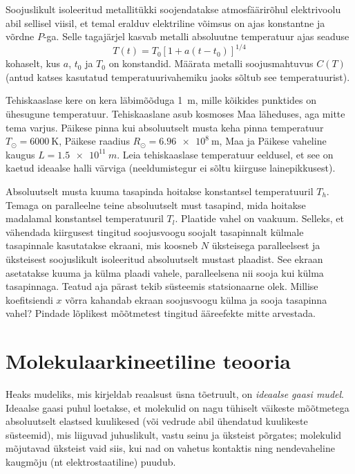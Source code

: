\documentclass[a4paper,11pt,twocolumn]{article}
\begin{document}
\begin{question}[IPhO 1996, T1]
	Soojuslikult isoleeritud metallitükki soojendatakse atmosfäärirõhul elektrivoolu abil sellisel viisil, et temal eralduv elektriline võimsus on ajas konstantne ja võrdne \( P \)-ga. Selle tagajärjel kasvab metalli absoluutne temperatuur ajas seaduse
	\[ T(t) = T_0[1 + a(t − t_0)]^{1/4} \]
	kohaselt, kus \( a \), \( t_0 \) ja \( T_0 \) on konstandid. Määrata metalli soojusmahtuvus \( C(T) \) (antud katses kasutatud temperatuurivahemiku jaoks sõltub see temperatuurist).
\end{question}
\begin{question}
	Tehiskaaslase kere on kera läbimõõduga \SI{1}{\meter}, mille kõikides punktides on ühesugune temperatuur. Tehiskaaslane asub kosmoses Maa läheduses, aga mitte tema varjus. Päikese pinna kui absoluutselt musta keha pinna temperatuur \( T_\odot = \SI{6000}{\kelvin} \), Päikese raadius \( R_\odot = \SI{6,96e8}{\meter} \), Maa ja Päikese vaheline kaugus \( L = \SI{1,5e11}{m} \). Leia tehiskaaslase temperatuur eeldusel, et see on kaetud ideaalse halli värviga (neeldumistegur ei sõltu kiirguse lainepikkusest).
\end{question}
\begin{question}[IPhO 1996, T1]
	Absoluutselt musta kuuma tasapinda hoitakse konstantsel temperatuuril \( T_h \). Temaga on paralleelne teine absoluutselt must tasapind, mida hoitakse madalamal konstantsel temperatuuril \( T_l \). Plaatide vahel on vaakuum. Selleks, et vähendada kiirgusest tingitud soojusvoogu soojalt tasapinnalt külmale tasapinnale kasutatakse ekraani, mis koosneb \( N \) üksteisega paralleelsest ja üksteisest soojuslikult isoleeritud absoluutselt mustast plaadist. See ekraan asetatakse kuuma ja külma plaadi vahele, paralleelsena nii sooja kui külma tasapinnaga. Teatud aja pärast tekib süsteemis statsionaarne olek. Millise koefitsiendi \( x \) võrra kahandab ekraan soojusvoogu külma ja sooja tasapinna vahel? Pindade lõplikest mõõtmetest
	tingitud ääreefekte mitte arvestada.
\end{question}

\section{Molekulaarkineetiline teooria}
Heaks mudeliks, mis kirjeldab reaalsust üsna tõetruult, on \textit{ideaalse gaasi mudel}. Ideaalse gaasi puhul loetakse, et molekulid on nagu tühiselt väikeste mõõtmetega absoluutselt elastsed kuulikesed (või vedrude abil ühendatud kuulikeste süsteemid), mis liiguvad juhuslikult, vastu seinu ja üksteist põrgates; molekulid mõjutavad üksteist vaid siis, kui nad on vahetus kontaktis ning nendevaheline kaugmõju (nt elektrostaatiline) puudub.
\end{document}
